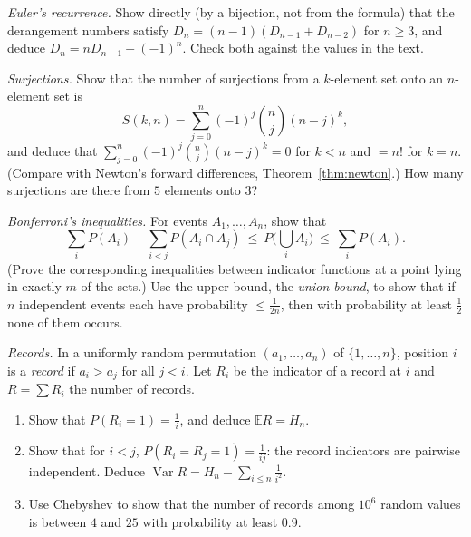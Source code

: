 \begin{exercise}[$\star\star$]\label{ex:derangrec}
\emph{Euler's recurrence.} Show directly (by a bijection, not from the formula) that the derangement numbers satisfy $D_n=(n-1)(D_{n-1}+D_{n-2})$ for $n\ge3$, and deduce $D_n=nD_{n-1}+(-1)^n$. Check both against the values in the text.
\end{exercise}

\begin{exercise}[$\star\star$]\label{ex:surj}
\emph{Surjections.} Show that the number of surjections from a $k$-element set onto an $n$-element set is
\[
S(k,n)=\sum_{j=0}^n(-1)^j\binom nj(n-j)^k ,
\]
and deduce that $\sum_{j=0}^n(-1)^j\binom nj(n-j)^k=0$ for $k<n$ and $=n!$ for $k=n$. (Compare with Newton's forward differences, Theorem~\ref{thm:newton}.) How many surjections are there from $5$ elements onto $3$?
\end{exercise}

\begin{exercise}[$\star\star$]\label{ex:bonferroni}
\emph{Bonferroni's inequalities.} For events $A_1,\dots,A_n$, show that
\[
\sum_iP(A_i)-\sum_{i<j}P(A_i\cap A_j)\ \le\ P\Big(\bigcup_iA_i\Big)\ \le\ \sum_iP(A_i).
\]
(Prove the corresponding inequalities between indicator functions at a point lying in exactly $m$ of the sets.) Use the upper bound, the \emph{union bound}, to show that if $n$ independent events each have probability $\le\frac1{2n}$, then with probability at least $\frac12$ none of them occurs.
\end{exercise}

\begin{exercise}[$\star\star$]\label{ex:records}
\emph{Records.} In a uniformly random permutation $(a_1,\dots,a_n)$ of $\{1,\dots,n\}$, position $i$ is a \emph{record} if $a_i>a_j$ for all $j<i$. Let $R_i$ be the indicator of a record at $i$ and $R=\sum R_i$ the number of records.
\begin{enumerate}[label=(\alph*)]
\item Show that $P(R_i=1)=\frac1i$, and deduce $\mathbb ER=H_n$.
\item Show that for $i<j$, $P(R_i=R_j=1)=\frac1{ij}$: the record indicators are pairwise independent. Deduce $\operatorname{Var}R=H_n-\sum_{i\le n}\frac1{i^2}$.
\item Use Chebyshev to show that the number of records among $10^6$ random values is between $4$ and $25$ with probability at least $0.9$.
\end{enumerate}
\end{exercise}

